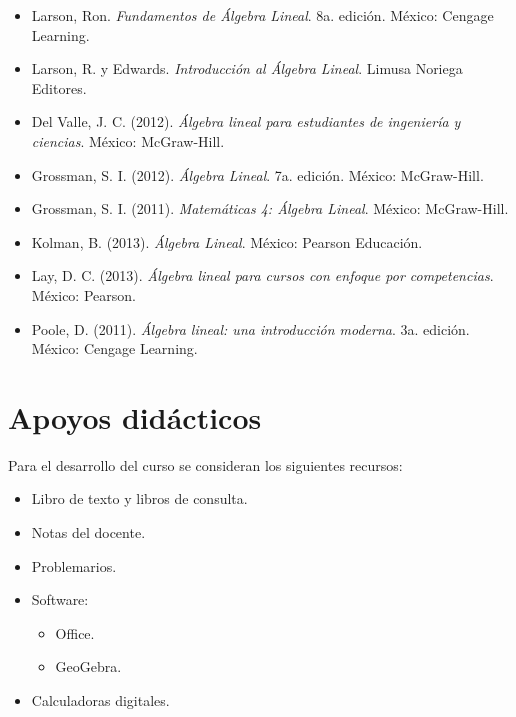 \documentclass[12pt]{article}
\begin{document}
\begin{itemize}
    \item Larson, Ron. \textit{Fundamentos de Álgebra Lineal}.
    8a. edición. México: Cengage Learning.

    \item Larson, R. y Edwards.
    \textit{Introducción al Álgebra Lineal}.
    Limusa Noriega Editores.

    \item Del Valle, J. C. (2012).
    \textit{Álgebra lineal para estudiantes de ingeniería y ciencias}.
    México: McGraw-Hill.

    \item Grossman, S. I. (2012).
    \textit{Álgebra Lineal}.
    7a. edición. México: McGraw-Hill.

    \item Grossman, S. I. (2011).
    \textit{Matemáticas 4: Álgebra Lineal}.
    México: McGraw-Hill.

    \item Kolman, B. (2013).
    \textit{Álgebra Lineal}.
    México: Pearson Educación.

    \item Lay, D. C. (2013).
    \textit{Álgebra lineal para cursos con enfoque por competencias}.
    México: Pearson.

    \item Poole, D. (2011).
    \textit{Álgebra lineal: una introducción moderna}.
    3a. edición. México: Cengage Learning.

\end{itemize}


\section*{Apoyos didácticos}

Para el desarrollo del curso se consideran los siguientes recursos:

\begin{itemize}
    \item Libro de texto y libros de consulta.
    \item Notas del docente.
    \item Problemarios.
    \item Software:
    \begin{itemize}
        \item Office.
        \item GeoGebra.
    \end{itemize}
    \item Calculadoras digitales.
\end{itemize}
\end{document}
